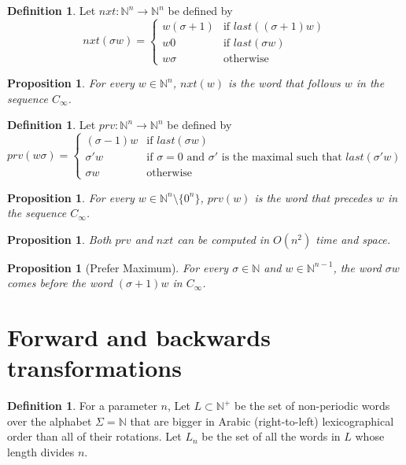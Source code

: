 \documentclass{article}
\newtheorem{proposition}[theorem]{Proposition}
\theoremstyle{definition}
\newtheorem{definition}[theorem]{Definition}
\newcommand{\N}{{\mathbb{N}}}
\begin{document}
\begin{definition}
Let $nxt\colon \N^n \to \N^n$ be defined by
$$nxt(\sigma w)=\begin{cases} 
w(\sigma+1) & \text{if }last((\sigma+1)w) \\
w0          & \text{if }last(\sigma w) \\
w\sigma     & \text{otherwise} 
\end{cases}$$
\end{definition}

\begin{proposition}
For every $w\in \N^n$, $nxt(w)$ is the word that follows $w$ in the sequence $C_\infty$.
\end{proposition}


\begin{definition}
Let $prv\colon \N^n \to \N^n$ be defined by
$$prv(w\sigma)=\begin{cases} 
(\sigma-1)w & \text{if }last(\sigma w) \\
\sigma'w   & \text{if $\sigma =0$  and $\sigma'$ is the maximal such that $last(\sigma' w)$} \\
\sigma w     & \text{otherwise} 
\end{cases}$$
\end{definition}
 
\begin{proposition}
For every $w\in \N^n\setminus \{0^n\}$, $prv(w)$ is the word that precedes $w$ in the sequence $C_\infty$.
\end{proposition}

\begin{proposition}
Both $prv$ and $nxt$ can be computed in $O(n^2)$ time and space.
\end{proposition}   

\begin{proposition}[Prefer Maximum]
For every $\sigma \in \N$ and $w \in \N^{n-1}$, the word $\sigma w$ comes before the word $(\sigma+1) w$ in $C_\infty$.
\end{proposition}
 


	
\section{Forward and backwards transformations}

\begin{definition}
	For a parameter $n$, Let $L \subset \N^+$ be the set of non-periodic words over the alphabet $\Sigma=\N$ that are bigger in Arabic (right-to-left) lexicographical order than all of their rotations. Let $L_n$ be the set of all the words in $L$ whose length divides $n$.
\end{definition}
\end{document}
